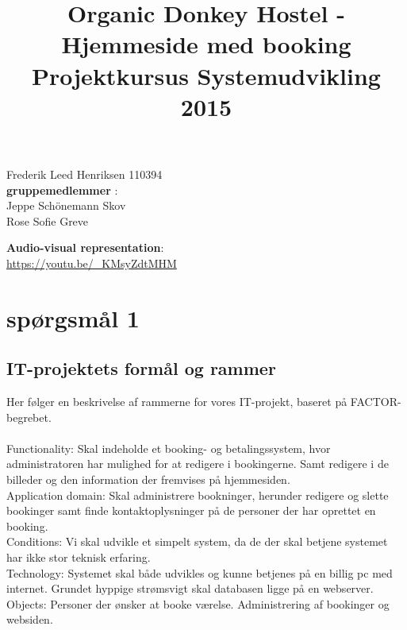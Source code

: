 \documentclass[12pt,a4paper]{article}
\begin{document}
\title{Organic Donkey Hostel - Hjemmeside med booking\\
Projektkursus Systemudvikling 2015}
\maketitle
\begin{center}
Frederik Leed Henriksen 110394\\ \bigskip
\textbf{gruppemedlemmer} :\\
Jeppe Schönemann Skov\\
Rose Sofie Greve\\
\end{center}
\begin{center}
\textbf{Audio-visual representation}: \\
\url{https://youtu.be/_KMsyZdtMHM}
\end{center}
\newpage
\tableofcontents
\newpage
\section{spørgsmål 1}
\subsection{IT-projektets formål og rammer}
Her følger en beskrivelse af rammerne for vores IT-projekt, baseret på FACTOR-begrebet.
\\\\
Functionality: Skal indeholde et booking- og betalingssystem, hvor administratoren har mulighed for at redigere i bookingerne. Samt redigere i de billeder og den information der fremvises på hjemmesiden. \\

Application domain: Skal administrere bookninger, herunder redigere og slette bookinger samt finde kontaktoplysninger på de personer der har oprettet en booking.\\
 
Conditions:  Vi skal udvikle et simpelt system, da de der skal betjene systemet har ikke stor teknisk erfaring.\\

Technology: Systemet skal både udvikles og kunne betjenes på en billig pc med internet. Grundet hyppige strømsvigt skal databasen ligge på en webserver. \\

Objects: Personer der ønsker at booke værelse. Administrering af bookinger og websiden.\\
\end{document}
